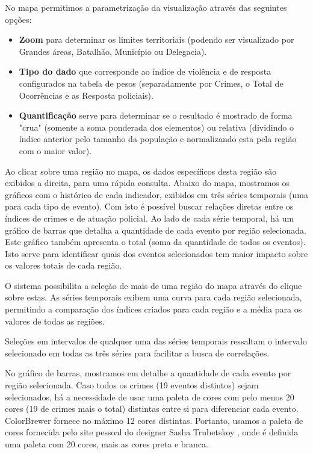 \documentclass[10pt,conference]{IEEEtran}
\begin{document}
No mapa permitimos a parametrização da visualização através das seguintes opções:
\begin{itemize}
\item \textbf{Zoom} para determinar os limites territoriais (podendo ser visualizado por Grandes áreas, Batalhão, Município ou Delegacia).
\item \textbf{Tipo do dado} que corresponde ao índice de violência e de resposta configurados na tabela de pesos (separadamente por Crimes, o Total de Ocorrências e as Resposta policiais).
\item \textbf{Quantificação} serve para determinar se o resultado é mostrado de forma "crua" (somente a soma ponderada dos elementos) ou relativa (dividindo o índice anterior pelo tamanho da população e normalizando esta pela região com o maior valor).
\end{itemize} 

Ao clicar sobre uma região no mapa, os dados específicos desta região são exibidos a direita, para uma rápida consulta. Abaixo do mapa, mostramos os gráficos com o histórico de cada indicador, exibidos em três séries temporais (uma para cada tipo de evento). Com isto é possível buscar relações diretas entre os índices de crimes e de atuação policial. Ao lado de cada série temporal, há um gráfico de barras que detalha a quantidade de cada evento por região selecionada. Este gráfico também apresenta o total (soma da quantidade de todos os eventos). Isto serve para identificar quais dos eventos selecionados tem maior impacto sobre os valores totais de cada região.

O sistema possibilita a seleção de mais de uma região do mapa através do clique sobre estas. As séries temporais exibem uma curva para cada região selecionada, permitindo a comparação dos índices criados para cada região e a média para os valores de todas as regiões. 

Seleções em intervalos de qualquer uma das séries temporais ressaltam o intervalo selecionado em todas as três séries para facilitar a busca de correlações.

No gráfico de barras, mostramos em detalhe a quantidade de cada evento por região selecionada. Caso todos os crimes (19 eventos distintos) sejam selecionados, há a necessidade de usar uma paleta de cores com pelo menos 20 cores (19 de crimes mais o total) distintas entre si para diferenciar cada evento. ColorBrewer \cite{CynthiaBrewer2013} fornece no máximo 12 cores distintas. Portanto, usamos a paleta de cores fornecida pelo site pessoal do designer Sasha Trubetskoy \cite{SashaTrubetskoy2017}, onde é definida uma paleta com 20 cores, mais as cores preta e branca.
\end{document}
